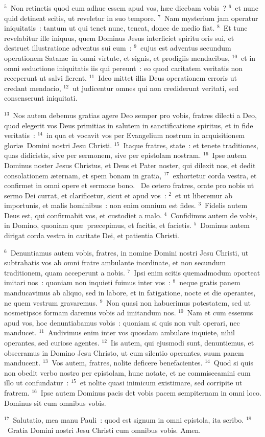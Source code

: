 ${}^{5}$~Non retinetis quod cum adhuc essem apud vos, h\ae c dicebam vobis~?
${}^{6}$~et nunc quid detineat scitis, ut reveletur in suo tempore.
${}^{7}$~Nam mysterium jam operatur iniquitatis~: tantum ut qui tenet nunc, teneat, donec de medio fiat.
${}^{8}$~Et tunc revelabitur ille iniquus, quem Dominus Jesus interficiet spiritu oris sui, et destruet illustratione adventus sui eum~:
${}^{9}$~cujus est adventus secundum operationem Satan\ae\ in omni virtute, et signis, et prodigiis mendacibus,
${}^{10}$~et in omni seductione iniquitatis iis qui pereunt~: eo quod caritatem veritatis non receperunt ut salvi fierent.
${}^{11}$~Ideo mittet illis Deus operationem erroris ut credant mendacio,
${}^{12}$~ut judicentur omnes qui non crediderunt veritati, sed consenserunt iniquitati.


${}^{13}$~Nos autem debemus gratias agere Deo semper pro vobis, fratres dilecti a Deo, quod elegerit vos Deus primitias in salutem in sanctificatione spiritus, et in fide veritatis~:
${}^{14}$~in qua et vocavit vos per Evangelium nostrum in acquisitionem glori\ae\ Domini nostri Jesu Christi.
${}^{15}$~Itaque fratres, state~: et tenete traditiones, quas didicistis, sive per sermonem, sive per epistolam nostram.
${}^{16}$~Ipse autem Dominus noster Jesus Christus, et Deus et Pater noster, qui dilexit nos, et dedit consolationem \ae ternam, et spem bonam in gratia,
${}^{17}$~exhortetur corda vestra, et confirmet in omni opere et sermone bono.
~De cetero fratres, orate pro nobis ut sermo Dei currat, et clarificetur, sicut et apud vos~:
${}^{2}$~et ut liberemur ab importunis, et malis hominibus~: non enim omnium est fides.
${}^{3}$~Fidelis autem Deus est, qui confirmabit vos, et custodiet a malo.
${}^{4}$~Confidimus autem de vobis, in Domino, quoniam qu\ae\ pr\ae cepimus, et facitis, et facietis.
${}^{5}$~Dominus autem dirigat corda vestra in caritate Dei, et patientia Christi.


${}^{6}$~Denuntiamus autem vobis, fratres, in nomine Domini nostri Jesu Christi, ut subtrahatis vos ab omni fratre ambulante inordinate, et non secundum traditionem, quam acceperunt a nobis.
${}^{7}$~Ipsi enim scitis quemadmodum oporteat imitari nos~: quoniam non inquieti fuimus inter vos~:
${}^{8}$~neque gratis panem manducavimus ab aliquo, sed in labore, et in fatigatione, nocte et die operantes, ne quem vestrum gravaremus.
${}^{9}$~Non quasi non habuerimus potestatem, sed ut nosmetipsos formam daremus vobis ad imitandum nos.
${}^{10}$~Nam et cum essemus apud vos, hoc denuntiabamus vobis~: quoniam si quis non vult operari, nec manducet.
${}^{11}$~Audivimus enim inter vos quosdam ambulare inquiete, nihil operantes, sed curiose agentes.
${}^{12}$~Iis autem, qui ejusmodi sunt, denuntiemus, et obsecramus in Domino Jesu Christo, ut cum silentio operantes, suum panem manducent.
${}^{13}$~Vos autem, fratres, nolite deficere benefacientes.
${}^{14}$~Quod si quis non obedit verbo nostro per epistolam, hunc notate, et ne commisceamini cum illo ut confundatur~:
${}^{15}$~et nolite quasi inimicum existimare, sed corripite ut fratrem.
${}^{16}$~Ipse autem Dominus pacis det vobis pacem sempiternam in omni loco. Dominus sit cum omnibus vobis.


${}^{17}$~Salutatio, mea manu Pauli~: quod est signum in omni epistola, ita scribo.
${}^{18}$~Gratia Domini nostri Jesu Christi cum omnibus vobis. Amen.
